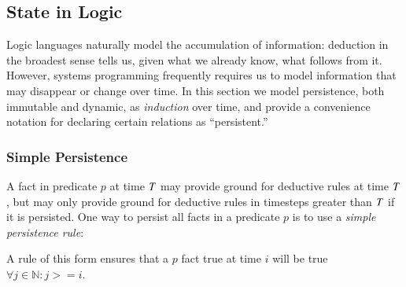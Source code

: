
\subsection{State in Logic}



Logic languages naturally model the accumulation of information: deduction in 
the broadest sense tells us, given what we already know, what follows from it.  However, systems
programming frequently requires us to model information that may disappear or change
over time.  In this section we model persistence, both immutable and dynamic, as
\emph{induction} over time, and provide a convenience notation for declaring certain
relations as ``persistent.''


\subsubsection{Simple Persistence}
%
A fact in predicate $p$ at time $\DT$ may provide ground for deductive rules at
time $\DT$, but may only provide ground for deductive rules in timesteps
greater than $\DT$ if it is persisted.  One way to persist all facts in a
predicate $p$ is to use a {\em simple persistence rule}:


\noindent A rule of this form ensures that a $p$ fact true at time $i$ will be
true $\forall j \in \mathbb{N} : j >= i$.


